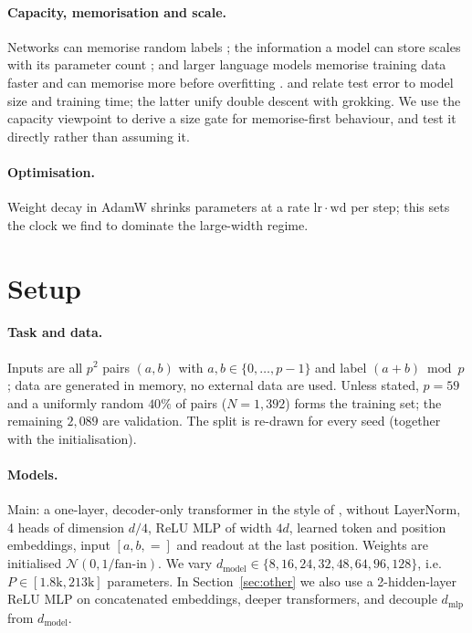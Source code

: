 \documentclass{article} %
\begin{document}
\paragraph{Capacity, memorisation and scale.} Networks can memorise random labels \citep{zhang2017rethinking}; the information a model can store scales with its parameter count \citep{morris2025memorize}; and larger language models memorise training data faster and can memorise more before overfitting \citep{tirumala2022memorization}. \citet{nakkiran2020deep} and \citet{davies2023unifying} relate test error to model size and training time; the latter unify double descent with grokking. We use the capacity viewpoint to derive a size gate for memorise-first behaviour, and test it directly rather than assuming it.

\paragraph{Optimisation.} Weight decay in AdamW \citep{loshchilov2019decoupled} shrinks parameters at a rate $\mathrm{lr}\cdot\mathrm{wd}$ per step; this sets the clock we find to dominate the large-width regime.

\section{Setup}
\label{sec:setup}
\paragraph{Task and data.} Inputs are all $p^2$ pairs $(a,b)$ with $a,b\in\{0,\dots,p-1\}$ and label $(a+b)\bmod p$; data are generated in memory, no external data are used. Unless stated, $p{=}59$ and a uniformly random $40\%$ of pairs ($N{=}1{,}392$) forms the training set; the remaining $2{,}089$ are validation. The split is re-drawn for every seed (together with the initialisation).

\paragraph{Models.} Main: a one-layer, decoder-only transformer in the style of \citet{nanda2023progress} \citep{vaswani2017attention}, without LayerNorm, 4 heads of dimension $d/4$, ReLU MLP of width $4d$, learned token and position embeddings, input $[a,b,{=}]$ and readout at the last position. Weights are initialised $\mathcal N(0,1/\text{fan-in})$. We vary $d_{\mathrm{model}}\in\{8,16,24,32,48,64,96,128\}$, i.e.\ $P\in[1.8\text{k},213\text{k}]$ parameters. In Section~\ref{sec:other} we also use a 2-hidden-layer ReLU MLP on concatenated embeddings, deeper transformers, and decouple $d_{\mathrm{mlp}}$ from $d_{\mathrm{model}}$.
\end{document}
